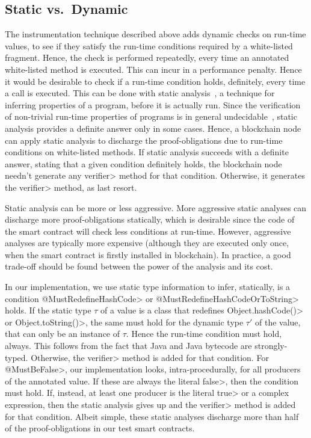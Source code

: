 \subsection{Static vs.\ Dynamic}\label{subsec:static_vs_dynamic}

The instrumentation technique described above adds dynamic checks on run-time values, to see
if they satisfy the run-time conditions required by a white-listed fragment.
Hence, the check is performed repeatedly, every time an annotated white-listed method
is executed. This can incur in a performance penalty. Hence it would be desirable
to check if a run-time condition holds, definitely, every time a call is executed.
This can be done with static analysis~\cite{NielsonNH99}, a technique for inferring
properties of a program, before it is actually run. Since the verification of
non-trivial run-time
properties of programs is in general undecidable~\cite{Rice53},
static analysis provides a definite answer
only in some cases. Hence, a blockchain node can apply static analysis to discharge
the proof-obligations due to run-time conditions on white-listed methods. If static
analysis succeeds with a definite answer, stating that a given condition definitely holds,
the blockchain node needn't generate any \<verifier> method for that condition. Otherwise, it
generates the \<verifier> method, as last resort.

Static analysis can be more or less aggressive.
More aggressive static analyses can discharge more proof-obligations statically,
which is desirable since the code of the smart contract will check less
conditions at run-time. However, aggressive analyses are typically more expensive
(although they are executed only once, when the smart contract is firstly installed in
blockchain). In practice, a good trade-off should be found between the power of the analysis
and its cost.

In our implementation, we use static type information to infer, statically, is a condition
\<@MustRedefineHashCode> or \<@MustRedefineHashCodeOrToString> holds. If the static type
$\tau$ of a value is a class that redefines \<Object.hashCode()> or \<Object.toString()>,
the same must hold for the dynamic type $\tau'$ of the value, that can only be an
instance of $\tau$. Hence the run-time condition must hold, always.
This follows from the fact that Java and Java bytecode
are strongly-typed. Otherwise, the \<verifier> method is added for that condition.
For \<@MustBeFalse>, our implementation looks, intra-procedurally, for
all producers of the annotated value.
If these are always the literal \<false>, then the condition
must hold. If, instead, at least one producer is the literal \<true> or a complex expression,
then the static analysis gives up and the \<verifier> method is added for that condition.
Albeit simple, these static analyses discharge more than half of the proof-obligations
in our test smart contracts.
